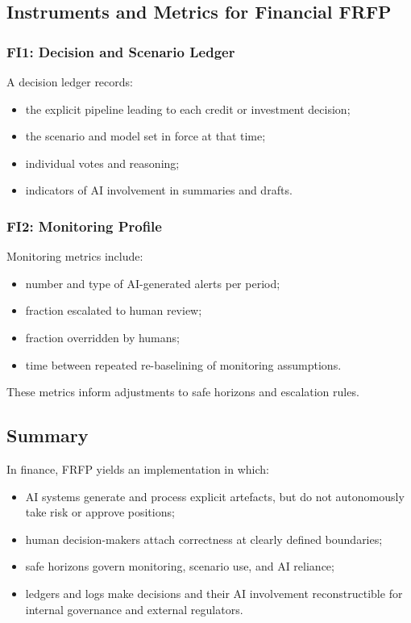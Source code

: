 \subsection{Instruments and Metrics for Financial FRFP}

\subsubsection*{FI1: Decision and Scenario Ledger}

A decision ledger records:

\begin{itemize}
  \item the explicit pipeline leading to each credit or investment decision;
  \item the scenario and model set in force at that time;
  \item individual votes and reasoning;
  \item indicators of AI involvement in summaries and drafts.
\end{itemize}

\subsubsection*{FI2: Monitoring Profile}

Monitoring metrics include:

\begin{itemize}
  \item number and type of AI-generated alerts per period;
  \item fraction escalated to human review;
  \item fraction overridden by humans;
  \item time between repeated re-baselining of monitoring assumptions.
\end{itemize}

These metrics inform adjustments to safe horizons and escalation rules.

\subsection{Summary}

In finance, FRFP yields an implementation in which:

\begin{itemize}
  \item AI systems generate and process explicit artefacts, but do not
        autonomously take risk or approve positions;
  \item human decision-makers attach correctness at clearly defined boundaries;
  \item safe horizons govern monitoring, scenario use, and AI reliance;
  \item ledgers and logs make decisions and their AI involvement reconstructible
        for internal governance and external regulators.
\end{itemize}

